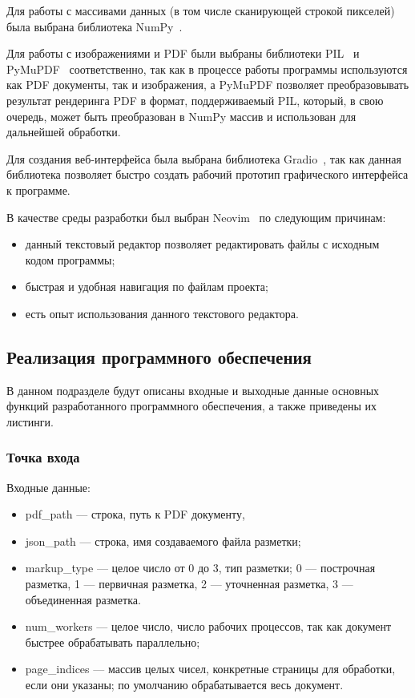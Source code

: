 Для работы с массивами данных (в том числе сканирующей строкой пикселей) была выбрана библиотека NumPy~\cite{numpy}.

Для работы с изображениями и PDF были выбраны библиотеки PIL~\cite{pil} и PyMuPDF~\cite{pymupdf} соответственно, так как в процессе работы программы используются как PDF документы, так и изображения, а PyMuPDF позволяет преобразовывать результат рендеринга PDF в формат, поддерживаемый PIL, который, в свою очередь, может быть преобразован в NumPy массив и использован для дальнейшей обработки.

Для создания веб-интерфейса была выбрана библиотека Gradio~\cite{gradio}, так как данная библиотека позволяет быстро создать рабочий прототип графического интерфейса к программе.

В качестве среды разработки был выбран Neovim~\cite{nvim} по следующим причинам:
\begin{itemize}
    \item данный текстовый редактор позволяет редактировать файлы с исходным кодом программы;
    \item быстрая и удобная навигация по файлам проекта;
    \item есть опыт использования данного текстового редактора.
\end{itemize}

\subsection{Реализация программного обеспечения}

В данном подразделе будут описаны входные и выходные данные основных функций разработанного программного обеспечения, а также приведены их листинги.


\subsubsection{Точка входа}
Входные данные:
\begin{itemize}
    \item pdf\_path --- строка, путь к PDF документу,
    \item json\_path --- строка, имя создаваемого файла разметки;
    \item markup\_type --- целое число от 0 до 3, тип разметки; 0 --- построчная разметка, 1 --- первичная разметка, 2 --- уточненная разметка, 3 --- объединенная разметка.
    \item num\_workers --- целое число, число рабочих процессов, так как документ быстрее обрабатывать параллельно;
    \item page\_indices --- массив целых чисел, конкретные страницы для обработки, если они указаны; по умолчанию обрабатывается весь документ.
\end{itemize}

